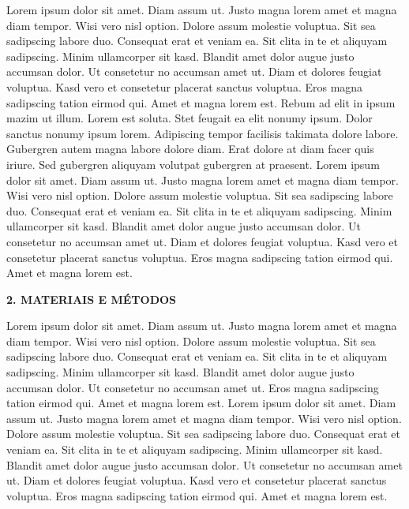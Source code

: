 \documentclass[final]{beamer}
\begin{document}
\begin{frame}[t]
\begin{columns}[t,totalwidth=0.6\paperwidth]
\begin{column}{0.45\paperwidth}
    \vspace{1.3cm}
     Lorem ipsum dolor sit amet. Diam assum ut. Justo magna lorem amet et magna diam tempor. Wisi vero nisl option. Dolore assum molestie voluptua. Sit sea sadipscing labore duo. Consequat erat et veniam ea. Sit clita in te et aliquyam sadipscing. Minim ullamcorper sit kasd. Blandit amet dolor augue justo accumsan dolor. Ut consetetur no accumsan amet ut. Diam et dolores feugiat voluptua. Kasd vero et consetetur placerat sanctus voluptua. Eros magna sadipscing tation eirmod qui. Amet et magna lorem est. Rebum ad elit in ipsum mazim ut illum. Lorem est soluta. Stet feugait ea elit nonumy ipsum. Dolor sanctus nonumy ipsum lorem. Adipiscing tempor facilisis takimata dolore labore. Gubergren autem magna labore dolore diam. Erat dolore at diam facer quis iriure. Sed gubergren aliquyam volutpat gubergren at praesent. 
       Lorem ipsum dolor sit amet. Diam assum ut. Justo magna lorem amet et magna diam tempor. Wisi vero nisl option. Dolore assum molestie voluptua. Sit sea sadipscing labore duo. Consequat erat et veniam ea. Sit clita in te et aliquyam sadipscing. Minim ullamcorper sit kasd. Blandit amet dolor augue justo accumsan dolor. Ut consetetur no accumsan amet ut. Diam et dolores feugiat voluptua. Kasd vero et consetetur placerat sanctus voluptua. Eros magna sadipscing tation eirmod qui. Amet et magna lorem est.

    \vspace{1.3cm}
    {\large\bfseries 2. MATERIAIS E MÉTODOS}\par
    \justifying
    \vspace{1.3cm}
  Lorem ipsum dolor sit amet. Diam assum ut. Justo magna lorem amet et magna diam tempor. Wisi vero nisl option. Dolore assum molestie voluptua. Sit sea sadipscing labore duo. Consequat erat et veniam ea. Sit clita in te et aliquyam sadipscing. Minim ullamcorper sit kasd. Blandit amet dolor augue justo accumsan dolor. Ut consetetur no accumsan amet ut. Eros magna sadipscing tation eirmod qui. Amet et magna lorem est.
    Lorem ipsum dolor sit amet. Diam assum ut. Justo magna lorem amet et magna diam tempor. Wisi vero nisl option. Dolore assum molestie voluptua. Sit sea sadipscing labore duo. Consequat erat et veniam ea. Sit clita in te et aliquyam sadipscing. Minim ullamcorper sit kasd. Blandit amet dolor augue justo accumsan dolor. Ut consetetur no accumsan amet ut. Diam et dolores feugiat voluptua. Kasd vero et consetetur placerat sanctus voluptua. Eros magna sadipscing tation eirmod qui. Amet et magna lorem est.


\end{column}
\end{columns}
\end{frame}
\end{document}
